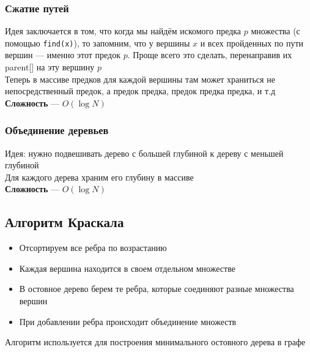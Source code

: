 \documentclass[a4paper]{article}
\newcommand{\code}[1]{\colorbox{codegray}{\texttt{#1}}}
\begin{document}
\subsubsection{Сжатие путей}
Идея заключается в том, что когда мы найдём искомого предка $p$ множества (с помощью \code{find(x)}), то запомним, что у вершины $x$ и всех пройденных по пути вершин — именно этот предок $p$. Проще всего это сделать, перенаправив их {\rm parent}[] на эту вершину $p$\\[2mm]
\indent Теперь в массиве предков для каждой вершины там может храниться не непосредственный предок, а предок предка, предок предка предка, и т.д\\[2mm]
\indent \textbf{Сложность} — $O(\log N)$

\subsubsection{Объединение деревьев}
Идея: нужно подвешивать дерево с большей глубиной к дереву с меньшей глубиной\\[2mm]
\indent Для каждого дерева храним его глубину в массиве\\[2mm]
\indent \textbf{Сложность} — $O(\log N)$

\subsection{Алгоритм Краскала}
\begin{itemize}
    \item Отсортируем все ребра по возрастанию
    \item Каждая вершина находится в своем отдельном множестве
    \item В остовное дерево берем те ребра, которые соединяют разные множества вершин
    \item При добавлении ребра происходит объединение множеств
\end{itemize}
Алгоритм используется для построения минимального остовного дерева в графе
\end{document}
